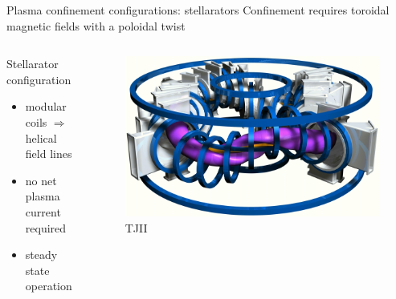 \documentclass{beamer}
\begin{document}
\begin{frame}{Plasma confinement configurations: stellarators}
  Confinement requires toroidal magnetic fields with a poloidal twist
  \begin{columns}
  \begin{block}{Stellarator configuration}
      \begin{itemize}
        \item modular coils $\Rightarrow$ helical field lines
        \item no net plasma current required
        \item steady state operation
      \end{itemize}
    \end{block}
    \begin{figure}
    \includegraphics[width=\textwidth]{graphics/TJII_model1}
    \caption{TJII} %
    \end{figure}
   \end{columns}
\end{frame}

\end{document}
